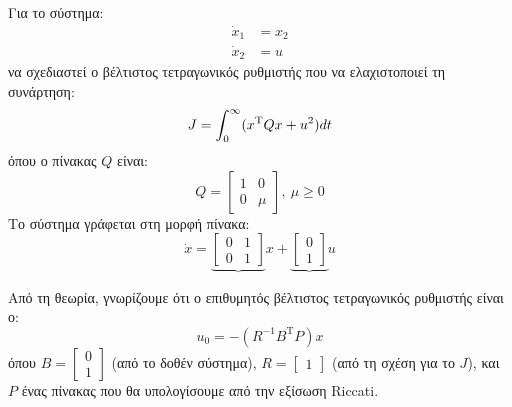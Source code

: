 \documentclass[11pt,a4paper,notitlepage,fleqn]{article}
\begin{document}
\begin{exercise}
	Για το σύστημα:
	\begin{align*}
		\dot x_1 &= x_2 \\
		\dot x_2 &= u
	\end{align*}
	να σχεδιαστεί ο βέλτιστος τετραγωνικός ρυθμιστής που να ελαχιστοποιεί
	τη συνάρτηση:
	\[
	J = \int_{0 }^{\infty} (x^{\mathrm T} Q x +u^2)d t
	\]
	όπου ο πίνακας \( Q \) είναι:
	\[
	Q = \left[\begin{matrix}
	1 & 0 \\ 0 & \mu
	\end{matrix}\right], \ \mu \geq 0
	\]
	\tcblower
	Το σύστημα γράφεται στη μορφή πίνακα:
	\[
	\dot x = \underbrace{\left[\begin{matrix}
		0 & 1 \\ 0 & 1
		\end{matrix}\right]}x + \underbrace{\left[\begin{matrix}
		0 \\ 1
		\end{matrix}\right]}u
	\]
	
	Από τη θεωρία, γνωρίζουμε ότι ο επιθυμητός βέλτιστος τετραγωνικός
	ρυθμιστής είναι ο:
	\[
	u_0 = -(R^{-1}B^{\mathrm T}P)x
	\]
	όπου \( B = \left[\begin{matrix}
	0 \\ 1
	\end{matrix}\right] \) (από το δοθέν σύστημα), \( R = \left[\begin{matrix}
	1
	\end{matrix}\right] \) (από τη σχέση για το \( J \)), και \( P \)
	ένας πίνακας που θα υπολογίσουμε από την εξίσωση Riccati.
	

\end{exercise}
\end{document}
